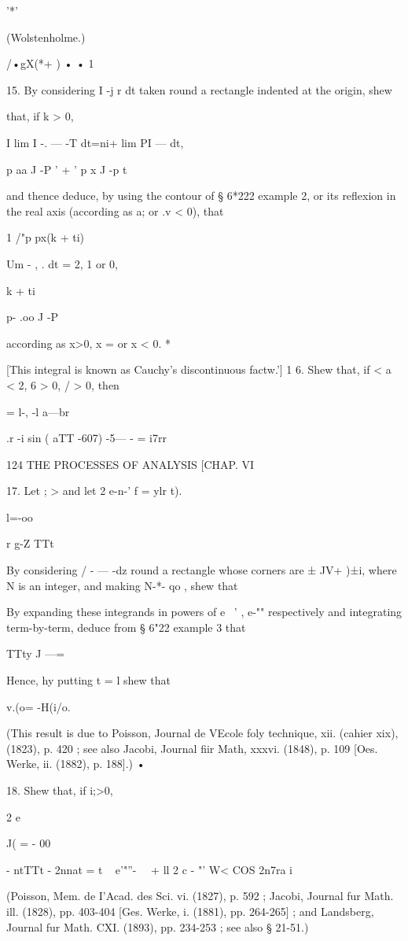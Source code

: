 '*'

(Wolstenholme.)

/•gX(*+ ) • • 1

15. By considering I -j r dt taken round a rectangle indented at the
origin, shew

that, if k > 0,

I lim I -. — -T dt=ni+ lim PI — dt,

p aa J -P ' + ' p x J -p t

and thence deduce, by using the contour of § 6*222 example 2, or its
reflexion in the real axis (according as a; or .v < 0), that



1 /"p px(k + ti)

Um - , . dt = 2, 1 or 0,



k + ti



p- .oo J -P

according as x>0, x = or x < 0. *

[This integral is known as Cauchy's discontinuous factw.'] 1 6. Shew
that, if < a < 2, 6 > 0, / > 0, then

= l-, -l a—br



.r -i sin ( aTT -607) -5— - = i7rr



124 THE PROCESSES OF ANALYSIS [CHAP. VI

17. Let ; > and let 2 e-n-' f = ylr t).

 l=-oo

r g-Z TTt

By considering / - — -dz round a rectangle whose corners are ± JV+
)±i, where N is an integer, and making N-*- qo , shew that

By expanding these integrands in powers of e~ ' , e-"" respectively
and integrating term-by-term, deduce from § 6"22 example 3 that

 TTty J ---=

Hence, hy putting t = l shew that

v.(o= -H(i/o.

(This result is due to Poisson, Journal de VEcole foly technique, xii.
(cahier xix), (1823), p. 420 ; see also Jacobi, Journal fiir Math,
xxxvi. (1848), p. 109 [Oes. Werke, ii. (1882), p. 188].) •

18. Shew that, if i;>0,



2 e

J( = - 00



- ntTTt - 2nnat = t ~ e'"''- \ \ + ll 2 c - "' W< COS 2n7ra i



(Poisson, Mem. de I'Acad. des Sci. vi. (1827), p. 592 ; Jacobi,
Journal fur Math. ill. (1828), pp. 403-404 [Ges. Werke, i. (1881), pp.
264-265] ; and Landsberg, Journal fur Math. CXI. (1893), pp. 234-253 ;
see also § 21-51.)

